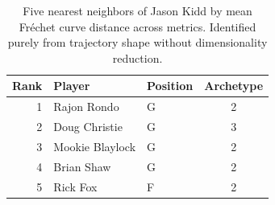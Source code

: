 \begin{table}[htbp]
  \centering\small
  \begin{tabular}{rllc}
    \toprule
    Rank & Player & Position & Archetype \\
    \midrule
    1 & Rajon Rondo & G & 2 \\
    2 & Doug Christie & G & 3 \\
    3 & Mookie Blaylock & G & 2 \\
    4 & Brian Shaw & G & 2 \\
    5 & Rick Fox & F & 2 \\
    \bottomrule
  \end{tabular}
  \caption{Five nearest neighbors of Jason Kidd by mean Fr\'{e}chet curve distance across metrics. Identified purely from trajectory shape without dimensionality reduction.}
  \label{tab:Jason_Kidd_frechet_curve_neighbors}
\end{table}

